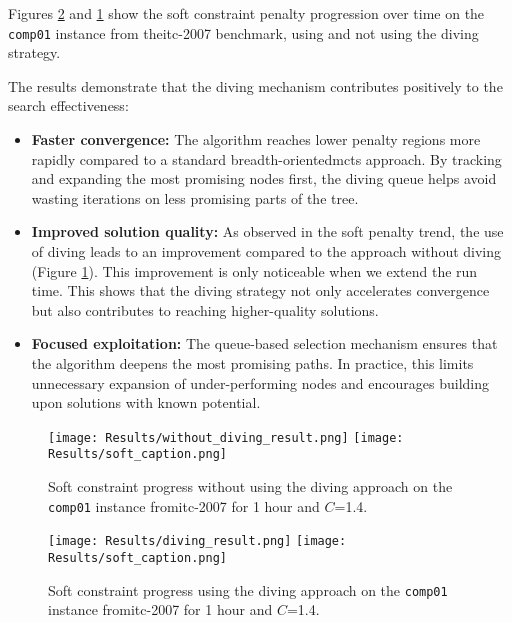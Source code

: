 Figures \ref{fig:diving_result} and \ref{fig:without_diving_result} show the soft constraint penalty progression over time on the \texttt{comp01} instance from the\ac{itc-2007} benchmark, using and not using the diving strategy.

The results demonstrate that the diving mechanism contributes positively to the search effectiveness:

\begin{itemize}
\item \textbf{Faster convergence:} The algorithm reaches lower penalty regions more rapidly compared to a standard breadth-oriented\ac{mcts} approach. By tracking and expanding the most promising nodes first, the diving queue helps avoid wasting iterations on less promising parts of the tree.

\item \textbf{Improved solution quality:} As observed in the soft penalty trend, the use of diving leads to an improvement compared to the approach without diving (Figure \ref{fig:without_diving_result}). This improvement is only noticeable when we extend the run time. This shows that the diving strategy not only accelerates convergence but also contributes to reaching higher-quality solutions.

\item \textbf{Focused exploitation:} The queue-based selection mechanism ensures that the algorithm deepens the most promising paths. In practice, this limits unnecessary expansion of under-performing nodes and encourages building upon solutions with known potential.
\end{itemize}

\begin{figure}
 \centering
    \texttt{[image: Results/without\_diving\_result.png]}
    \texttt{[image: Results/soft\_caption.png]}
    \caption{Soft constraint progress without using the diving approach on the \texttt{comp01} instance from\ac{itc-2007} for 1 hour and \(C\)=1.4.}
    \label{fig:without_diving_result}
\end{figure}

\begin{figure}
 \centering
    \texttt{[image: Results/diving\_result.png]}
    \texttt{[image: Results/soft\_caption.png]}
    \caption{Soft constraint progress using the diving approach on the \texttt{comp01} instance from\ac{itc-2007} for 1 hour and \(C\)=1.4.}
    \label{fig:diving_result}
\end{figure}

